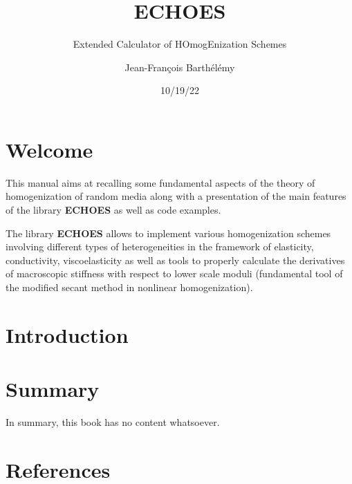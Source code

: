 \documentclass[
  letterpaper,
  DIV=11,
  numbers=noendperiod]{scrreprt}
\title{ECHOES}
\subtitle{Extended Calculator of HOmogEnization Schemes}
\author{Jean-François Barthélémy}
\date{10/19/22}
\renewcommand*\contentsname{Table of contents}
\newcommand\contentsname{Table of contents}
\begin{document}
\maketitle
\renewcommand*\contentsname{Table of contents}
{
\hypersetup{linkcolor=}
\setcounter{tocdepth}{2}
\tableofcontents
}

\hypertarget{welcome}{%
\chapter*{Welcome}\label{welcome}}


This manual aims at recalling some fundamental aspects of the theory of
homogenization of random media along with a presentation of the main
features of the library \textbf{ECHOES} as well as code examples.

The library \textbf{ECHOES} allows to implement various homogenization
schemes involving different types of heterogeneities in the framework of
elasticity, conductivity, viscoelasticity as well as tools to properly
calculate the derivatives of macroscopic stiffness with respect to lower
scale moduli (fundamental tool of the modified secant method in
nonlinear homogenization).


\hypertarget{introduction}{%
\chapter{Introduction}\label{introduction}}


\hypertarget{summary}{%
\chapter{Summary}\label{summary}}

In summary, this book has no content whatsoever.


\hypertarget{references}{%
\chapter*{References}\label{references}}

\end{document}
